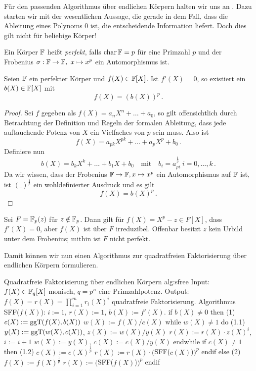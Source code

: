 Für den passenden Algorithmus über endlichen Körpern halten wir uns an
\autocite[Section 8.3]{geddes:algorithms}. Dazu starten wir mit der
wesentlichen Aussage, die gerade in dem Fall, dass die Ableitung eines Polynoms
$0$ ist, die entscheidende Information liefert. Doch dies gilt nicht für
beliebige Körper!

\begin{definition}
  Ein Körper $\mathbb{F}$ heißt \emph{perfekt}, falls $\operatorname{char} \mathbb{F} = p$ für eine
  Primzahl $p$ und der Frobenius $\sigma: \mathbb{F} \to \mathbb{F},\ x \mapsto x^p$ ein
  Automorphismus ist.
\end{definition}

\begin{prop}\label{prop:sfree1}
  Seien $\mathbb{F}$ ein perfekter Körper und $f(X) \in \mathbb{F}[X]$. 
  Ist $f'(X) = 0$, so existiert ein $b(X) \in \mathbb{F}[X]$ mit
  \[ f(X) = (b(X))^p\,.\]
\end{prop}

\begin{proof}
  Sei $f$ gegeben als $f(X) = a_nX^n + \ldots + a_0$, so gilt offensichtlich
  durch Betrachtung der Definition und Regeln der formalen Ableitung, dass
  jede auftauchende Potenz von $X$ ein Vielfaches von $p$ sein muss. Also ist
  \[ f(X) = a_{pk} X^{pk} + \ldots + a_p X^p + b_0\,.\]
  Definiere nun 
  \[ b(X) = b_k X^k + \ldots + b_1 X + b_0 \quad\text{mit}\quad
    b_i = a_{pi}^{\frac 1 p}\ i=0,\ldots,k\,.\]
  Da wir wissen, dass der Frobenius $\mathbb{F} \to \mathbb{F}, x \mapsto x^p$ ein
  Automorphismus auf $\mathbb{F}$ ist, ist $(\_)^{\frac 1 p}$ ein wohldefinierter
  Ausdruck und es gilt 
  \[ f(X) = b(X)^p\,.\]
\end{proof}

\begin{beispiel}
  Sei $F = \mathbb{F}_p(z)$ für $z\notin \mathbb{F}_p$. Dann gilt für $f(X) = X^p-z \in F[X]$,
  dass $f'(X) = 0$, aber $f(X)$ ist über $F$ irreduzibel. Offenbar besitzt $z$
  kein Urbild unter dem Frobenius; mithin ist $F$ nicht perfekt.
\end{beispiel}


Damit können wir nun einen Algorithmus zur quadratfreien Faktorisierung über
endlichen Körpern formulieren.


\begin{pseudocode}{Quadratfreie Faktorisierung über endlichen Körpern}%
 {alg:sfree}
Input:  $f(X) \in \mathbb{F}_q[X]$ monisch, $q=p^n$ eine Primzahlpotenz.
Output: $f(X) = r(X) = \prod_{i=1}^m r_i(X)^i$ quadratfreie Faktorisierung.
Algorithmus SFF($f(X)$):
$i:=1$, $r(X) := 1$, $b(X) := f'(X)$.
if $b(X) \neq 0$ then		(1)
  $c(X) := \operatorname{ggT}(f(X),b(X))$
  $w(X) := f(X) / c(X)$
  while $w(X) \neq 1$ do		(1.1)
    $y(X) := \operatorname{ggT}(w(X),c(X))$, $z(X) := w(X) / y(X)$
    $r(X) := r(X)\cdot z(X)^i$, $i := i+1$
    $w(X) := y(X)$, $c(X) := c(X) / y(X)$
  endwhile
  if $c(X) \neq 1$ then		(1.2)
    $c(X) := c(X)^{\frac 1 p}$
    $r(X) := r(X) \cdot ($SFF($c(X)$)$)^p$
  endif
else		(2)
  $f(X) := f(X)^{\frac 1 p}$
  $r(X) := ($SFF($f(X)$)$)^p$
endif
\end{pseudocode}


